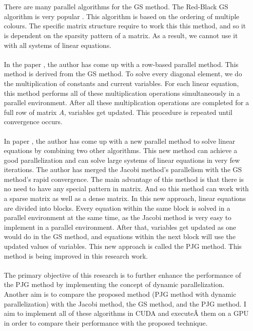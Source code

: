 \documentclass[11pt]{article}       %
\begin{document}
\\
\\
There are many parallel algorithms for the GS method. The Red-Black GS algorithm is very popular \cite{rbgs}. This algorithm is based on the ordering of multiple colours. The specific matrix structure require to work this this method, and so it is dependent on the sparsity pattern of a matrix. As a result, we cannot use it with all systems of linear equations.
\\
\\
In the paper \cite{row-based}, the author has come up with a row-based parallel method. This method is derived from the GS method. To solve every diagonal element, we do the multiplication of constants and current variables. For each linear equation, this method performs all of these multiplication operations simultaneously in a parallel environment. After all these multiplication operations are completed for a full row of matrix $A$, variables get updated. This procedure is repeated until convergence occurs.
\\
\\
In paper \cite{base-paper}, the author has come up with a new parallel method to solve linear equations by combining two other algorithms. This new method can achieve a good parallelization and can solve large systems of linear equations in very few iterations. The author has merged the Jacobi method's parallelism with the GS method's rapid convergence. The main advantage of this method is that there is no need to have any special pattern in matrix. And so this method can work with a sparse matrix as well as a dense matrix. In this new approach, linear equations are divided into blocks. Every equation within the same block is solved in a parallel environment at the same time, as the Jacobi method is very easy to implement in a parallel environment. After that, variables get updated as one would do in the GS method, and equations within the next block will use the updated values of variables. This new approach is called the PJG method. This method is being improved in this research work.
\\
\\
The primary objective of this research is to further enhance the performance of the PJG method by implementing the concept of dynamic parallelization. Another aim is to compare the proposed method (PJG method with dynamic parallelization) with the Jacobi method, the GS method, and the PJG method. I aim to implement all of these algorithms in CUDA and executeÂ them on a GPU in order to compare their performance with the proposed technique.



\end{document}
